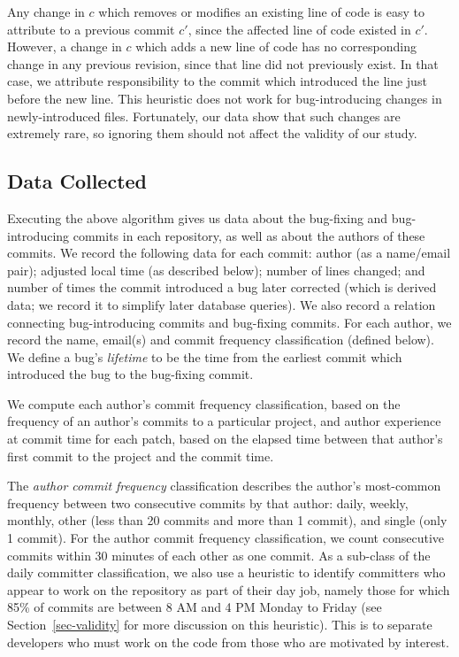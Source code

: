 Any change in $c$ which removes or modifies an existing line of code is easy to
attribute to a previous commit $c'$, since the affected line of code existed in
$c'$. However, a change in $c$ which adds a new line of code has no
corresponding change in any previous revision, since that line did not
previously exist. In that case, we attribute responsibility to the commit which
introduced the line just before the new line. This heuristic does not work for
bug-introducing changes in newly-introduced files. Fortunately, our data show
that such changes are extremely rare, so ignoring them should not affect the validity of our study. 

\subsection{Data Collected}
\label{sec:data}

Executing the above algorithm gives us data about the bug-fixing and
bug-introducing commits in each repository, as well as about the authors of
these commits. We record the following data for each commit: author (as a
name/email pair); adjusted local time (as described below); number of lines changed;
and number of times the commit introduced a bug later corrected (which is
derived data; we record it to simplify later database queries). We also record a
relation connecting bug-introducing commits and bug-fixing commits. For each
author, we record the name, email(s) and 
commit frequency classification (defined below). We define a
bug's {\em lifetime} to be the time from the earliest commit which introduced 
the bug to the bug-fixing commit.

We compute each author's commit frequency classification, based on the frequency of an
author's commits to a particular project, and author experience at commit time
for each patch, based on the elapsed time between that author's first commit to
the project and the commit time.

The {\em author commit frequency} classification describes the author's most-common
frequency between two consecutive commits by that author: daily, weekly, monthly, other (less than
20 commits and more than 1 commit), and single (only 1 commit). For the author commit frequency classification,
we count consecutive commits within 30 minutes of each other as one commit. As a
sub-class of the daily committer classification, we also use a heuristic to
identify committers who appear to work on the repository as part of their day
job, namely those for which 85\% of commits are between 8 AM and 4 PM Monday to
Friday (see Section~\ref{sec-validity} for more discussion on this heuristic). This is to separate developers who must work on the code from those who
are motivated by interest.

